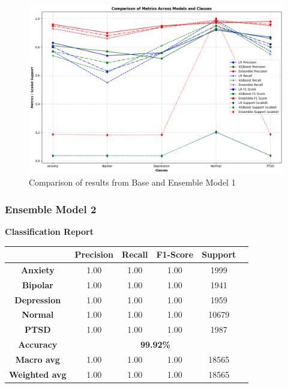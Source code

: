 \begin{figure}[h!]  
    \centering
    \includegraphics[width=1.0\textwidth]{Images/EM RESULT.png}  
    \caption{Comparison of results from Base and Ensemble Model 1}
    \label{dfdl1244883}  %
\end{figure}

\subsubsection{Ensemble Model 2}

\begin{center}
    \textbf{Classification Report} \\[0.5em]
    \begin{tabular}{|c|c|c|c|c|c|}
        \hline
        & \textbf{Precision} & \textbf{Recall} & \textbf{F1-Score} & \textbf{Support} \\ \hline
        \textbf{Anxiety}    & 1.00 & 1.00 & 1.00 & 1999 \\ \hline
        \textbf{Bipolar}    & 1.00 & 1.00 & 1.00 & 1941 \\ \hline
        \textbf{Depression} & 1.00 & 1.00 & 1.00 & 1959 \\ \hline
        \textbf{Normal}     & 1.00 & 1.00 & 1.00 & 10679 \\ \hline
        \textbf{PTSD}       & 1.00 & 1.00 & 1.00 & 1987 \\ \hline
        \textbf{Accuracy}   & \multicolumn{4}{c|}{\textbf{99.92\%}} \\ \hline
        \textbf{Macro avg}  & 1.00 & 1.00 & 1.00 & 18565 \\ \hline
        \textbf{Weighted avg} & 1.00 & 1.00 & 1.00 & 18565 \\ \hline
    \end{tabular}
\end{center}


